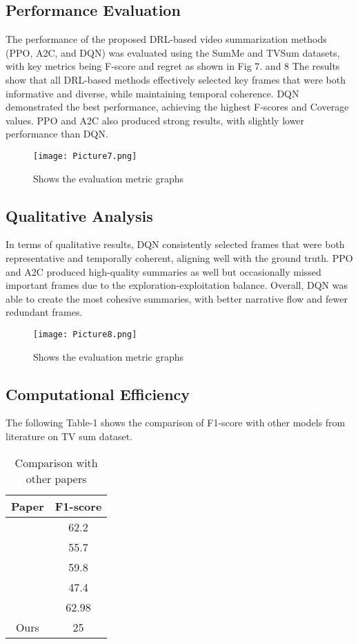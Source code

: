 \documentclass[conference]{IEEEtran}
\begin{document}
\subsection{\textbf{Performance Evaluation}}
The performance of the proposed DRL-based video summarization methods (PPO, A2C, and DQN) was evaluated using the SumMe and TVSum datasets, with key metrics being F-score and regret as shown in Fig 7. and 8  The results show that all DRL-based methods effectively selected key frames that were both informative and diverse, while maintaining temporal coherence. DQN demonstrated the best performance, achieving the highest F-scores and Coverage values. PPO and A2C also produced strong results, with slightly lower performance than DQN.
\begin{figure}[htbp]
\centerline{\texttt{[image: Picture7.png]}}
\caption{Shows the evaluation metric graphs}
\label{fig}
\end{figure}

\subsection{\textbf{Qualitative Analysis}}
In terms of qualitative results, DQN consistently selected frames that were both representative and temporally coherent, aligning well with the ground truth. PPO and A2C produced high-quality summaries as well but occasionally missed important frames due to the exploration-exploitation balance. Overall, DQN was able to create the most cohesive summaries, with better narrative flow and fewer redundant frames.

\begin{figure}[htbp]
\centerline{\texttt{[image: Picture8.png]}}
\caption{Shows the evaluation metric graphs}
\label{fig}
\end{figure}


\subsection{\textbf{Computational Efficiency}}
The following Table-1 shows the comparison of F1-score with other models from literature on TV sum dataset.

\begin{table}[h]
\centering
\caption{Comparison with other papers} %
\renewcommand{\arraystretch}{1.2} %
\begin{tabular}{|c|c|}
\hline
Paper & F1-score \\ \hline
[1] & 62.2 \\ \hline
[2] & 55.7 \\ \hline
[3] & 59.8 \\ \hline
[4] & 47.4 \\ \hline
[5] & 62.98 \\ \hline
Ours & 25 \\ \hline
\end{tabular}
\end{table}
\end{document}
